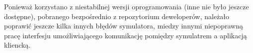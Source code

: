 	Ponieważ korzystano z niestabilnej wersji oprogramowania (inne nie było jeszcze dostępne), pobranego bezpośrednio z repozytorium deweloperów, należało poprawić jeszcze kilka innych błędów symulatora,
	miedzy innymi niepoprawną pracę interfesju umożliwiającego komunikację pomiędzy symulatrem a aplikacją kliencką.